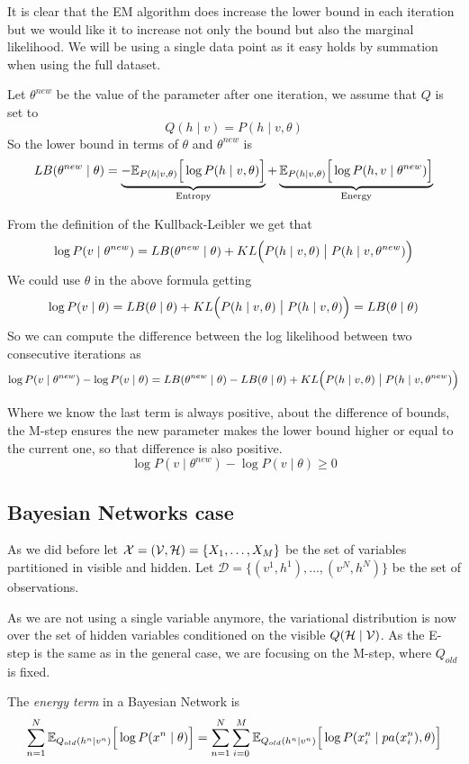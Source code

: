 It is clear that the EM algorithm does increase the lower bound in each iteration but we would like it to increase not only the bound but also the marginal likelihood. We will be using a single data point as it easy holds by summation when using the full dataset.

Let \(\theta^{new}\) be the value of the parameter after one iteration, we assume that \(Q\) is set to
\[
  Q(h \mid v) = P(h \mid v, \theta)
\]
So the lower bound in terms of \(\theta\) and \(\theta^{new}\) is
\[
  LB(\theta^{new} \mid \theta) =  \underbrace{-\mathbb{E}_{P(h \mid v, \theta)}\Big[\log{P(h \mid v, \theta)}\Big]}_{\text{Entropy}} + \underbrace{\mathbb{E}_{P(h \mid v, \theta)}\Big[\log{P(h,v \mid \theta^{new})}\Big]}_{\text{Energy}}
\]

From the definition of the Kullback-Leibler we get that
\[
  \log{P(v \mid \theta^{new})} = LB(\theta^{new}\mid \theta) + KL\Big(P(h \mid v, \theta) \bigm| P(h \mid v, \theta^{new})\Big)
\]
We could use \(\theta\) in the above formula getting
\[
  \log{P(v \mid \theta)} = LB(\theta \mid \theta) + KL\Big(P(h \mid v, \theta) \bigm| P(h \mid v, \theta)\Big) = LB(\theta \mid \theta)
\]
So we can compute the difference between the log likelihood between two consecutive iterations as
\[
  \log{P(v \mid \theta^{new})} - \log{P(v \mid \theta)} = LB(\theta^{new}\mid \theta) - LB(\theta \mid \theta) +  KL\Big(P(h \mid v, \theta) \bigm| P(h \mid v, \theta^{new})\Big)
\]

Where we know the last term is always positive, about the difference of bounds, the M-step ensures the new parameter makes the lower bound higher or equal to the current one, so that difference is also positive.
\[
   \log{P(v \mid \theta^{new})} - \log{P(v \mid \theta)} \geq 0
\]

\subsection{Bayesian Networks case}

As we did before let \(\mathcal{X} = (\mathcal{V}, \mathcal{H}) = \{X_{1}, \dots , X_{M}\}\) be the set of variables partitioned in visible and hidden. Let \(\mathcal{D} = \{(v^{1},h^{1}),\dots,(v^{N},h^{N})\}\) be the set of observations.

As we are not using a single variable anymore, the variational distribution is now over the set of hidden variables conditioned on the visible \(Q(\mathcal{H} \mid \mathcal{V})\). As the E-step is the same as in the general case, we are focusing on the M-step, where \(Q_{old}\) is fixed.

The \emph{energy term} in a Bayesian Network is
\[
  \sum_{n=1}^{N} \mathbb{E}_{Q_{old}(h^{n} \mid v^{n})}\Big[ \log{P(x^{n} \mid \theta)} \Big] = \sum_{n = 1}^{N}\sum_{i = 0}^{M} \mathbb{E}_{Q_{old}(h^{n} \mid v^{n})}\Big[\log{P( x_{i}^{n} \mid pa(x_{i}^{n}), \theta)}\Big]
\]

